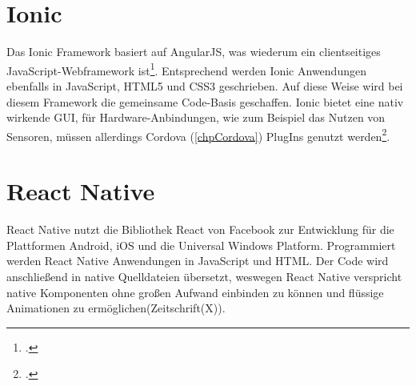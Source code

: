 \section{Ionic}

Das Ionic Framework basiert auf AngularJS, was wiederum ein clientseitiges JavaScript-Webframework ist\footcite{AngularJS}. Entsprechend werden Ionic Anwendungen ebenfalls in JavaScript, HTML5 und CSS3 geschrieben. Auf diese Weise wird bei diesem Framework die gemeinsame Code-Basis geschaffen. Ionic bietet eine nativ wirkende GUI, für Hardware-Anbindungen, wie zum Beispiel das Nutzen von Sensoren, müssen allerdings Cordova (\ref{chpCordova}) PlugIns genutzt werden\footcite{Ionic}. 

\section{React Native}

React Native nutzt die Bibliothek React von Facebook zur Entwicklung für die Plattformen Android, iOS und die Universal Windows Platform. Programmiert werden React Native Anwendungen in JavaScript und HTML. Der Code wird anschließend in native Quelldateien übersetzt, weswegen React Native verspricht native Komponenten ohne großen Aufwand einbinden zu können und flüssige Animationen zu ermöglichen(Zeitschrift(X)).
